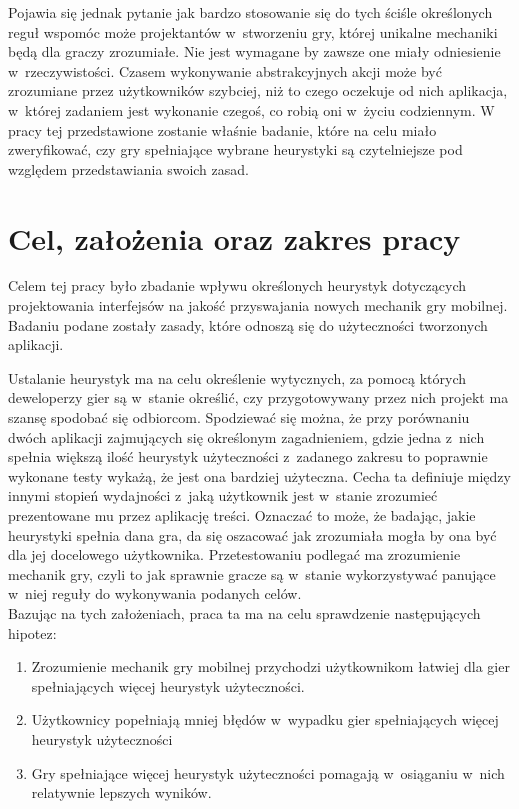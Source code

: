 \documentclass[a4paper,12pt,numbers=noenddot]{report}
\begin{document}
Pojawia się jednak pytanie jak bardzo stosowanie się do tych ściśle określonych reguł wspomóc może projektantów w~stworzeniu gry, której unikalne mechaniki będą dla graczy zrozumiałe. Nie jest wymagane by zawsze one miały odniesienie w~rzeczywistości. Czasem wykonywanie abstrakcyjnych akcji może być zrozumiane przez użytkowników szybciej, niż to czego oczekuje od nich aplikacja, w~której zadaniem jest wykonanie czegoś, co robią oni w~życiu codziennym. W pracy tej przedstawione zostanie właśnie badanie, które na celu miało zweryfikować, czy gry spełniające wybrane heurystyki są czytelniejsze pod względem przedstawiania swoich zasad. 

\chapter{Cel, założenia oraz zakres pracy}
Celem tej pracy było zbadanie wpływu określonych heurystyk dotyczących projektowania interfejsów na jakość przyswajania nowych mechanik gry mobilnej. Badaniu podane zostały zasady, które odnoszą się do użyteczności tworzonych aplikacji.

Ustalanie heurystyk ma na celu określenie wytycznych, za pomocą których deweloperzy gier są w~stanie określić, czy przygotowywany przez nich projekt ma szansę spodobać się odbiorcom. Spodziewać się można, że przy porównaniu dwóch aplikacji zajmujących się określonym zagadnieniem, gdzie jedna z~nich spełnia większą ilość heurystyk użyteczności z~zadanego zakresu to poprawnie wykonane testy wykażą, że jest ona bardziej użyteczna. Cecha ta definiuje między innymi stopień wydajności z~jaką użytkownik jest w~stanie zrozumieć prezentowane mu przez aplikację treści. Oznaczać to może, że badając, jakie heurystyki spełnia dana gra, da się oszacować jak zrozumiała mogła by ona być dla jej docelowego użytkownika. Przetestowaniu podlegać ma zrozumienie mechanik gry, czyli to jak sprawnie gracze są w~stanie wykorzystywać panujące w~niej reguły do wykonywania podanych celów.\\
Bazując na tych założeniach, praca ta ma na celu sprawdzenie następujących hipotez:

\begin{enumerate}
\item Zrozumienie mechanik gry mobilnej przychodzi użytkownikom łatwiej dla gier spełniających więcej heurystyk użyteczności.
\item Użytkownicy popełniają mniej błędów w~wypadku gier spełniających więcej heurystyk użyteczności
\item Gry spełniające więcej heurystyk użyteczności pomagają w~osiąganiu w~nich relatywnie lepszych wyników.
\end{enumerate}
\end{document}
